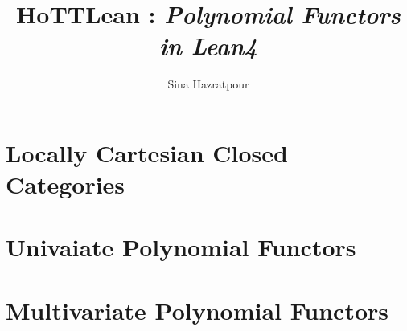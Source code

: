 
\title{HoTTLean : { \it Polynomial Functors in Lean4} }
\author{Sina Hazratpour}


\maketitle

\chapter{Locally Cartesian Closed Categories}

\chapter{Univaiate Polynomial Functors}

\chapter{Multivariate Polynomial Functors}


{}



